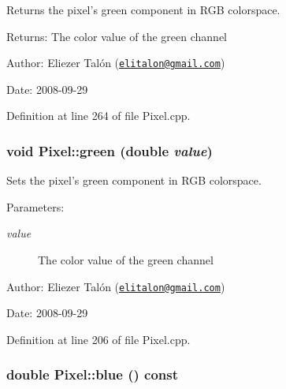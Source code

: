 Returns the pixel's green component in RGB colorspace. 

\begin{Desc}
\item[Returns:]The color value of the green channel\end{Desc}
\begin{Desc}
\item[Author:]Eliezer Talón (\href{mailto:elitalon@gmail.com}{\tt elitalon@gmail.com}) \end{Desc}
\begin{Desc}
\item[Date:]2008-09-29 \end{Desc}


Definition at line 264 of file Pixel.cpp.\hypertarget{class_pixel_98aaded2bc7bf4708edaaf2445acae0f}{
\subsubsection[green]{\setlength{\rightskip}{0pt plus 5cm}void Pixel::green (double {\em value})}}
\label{class_pixel_98aaded2bc7bf4708edaaf2445acae0f}


Sets the pixel's green component in RGB colorspace. 

\begin{Desc}
\item[Parameters:]
\begin{description}
\item[{\em value}]The color value of the green channel\end{description}
\end{Desc}
\begin{Desc}
\item[Author:]Eliezer Talón (\href{mailto:elitalon@gmail.com}{\tt elitalon@gmail.com}) \end{Desc}
\begin{Desc}
\item[Date:]2008-09-29 \end{Desc}


Definition at line 206 of file Pixel.cpp.\hypertarget{class_pixel_978b4078a48ff2a67b55dd10eec78fb2}{
\subsubsection[blue]{\setlength{\rightskip}{0pt plus 5cm}double Pixel::blue () const}}
\label{class_pixel_978b4078a48ff2a67b55dd10eec78fb2}


